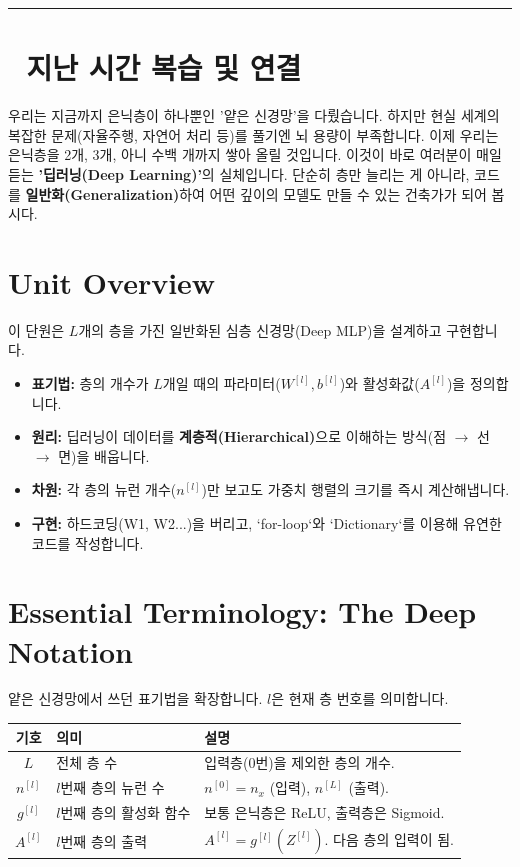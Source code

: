 \documentclass[11pt,a4paper]{book}
\theoremstyle{definition}
\begin{document}
\vspace{0.5cm}
\hrule
\vspace{0.5cm}

\section*{🔗 지난 시간 복습 및 연결}
우리는 지금까지 은닉층이 하나뿐인 '얕은 신경망'을 다뤘습니다. 하지만 현실 세계의 복잡한 문제(자율주행, 자연어 처리 등)를 풀기엔 뇌 용량이 부족합니다.
이제 우리는 은닉층을 2개, 3개, 아니 수백 개까지 쌓아 올릴 것입니다. 이것이 바로 여러분이 매일 듣는 \textbf{'딥러닝(Deep Learning)'}의 실체입니다. 단순히 층만 늘리는 게 아니라, 코드를 \textbf{일반화(Generalization)}하여 어떤 깊이의 모델도 만들 수 있는 건축가가 되어 봅시다.

\section{Unit Overview}
\begin{summarybox}[title={핵심 목표}]
이 단원은 $L$개의 층을 가진 일반화된 심층 신경망(Deep MLP)을 설계하고 구현합니다.
\begin{itemize}
    \item \textbf{표기법:} 층의 개수가 $L$개일 때의 파라미터($W^{[l]}, b^{[l]}$)와 활성화값($A^{[l]}$)을 정의합니다.
    \item \textbf{원리:} 딥러닝이 데이터를 \textbf{계층적(Hierarchical)}으로 이해하는 방식(점 $\to$ 선 $\to$ 면)을 배웁니다.
    \item \textbf{차원:} 각 층의 뉴런 개수($n^{[l]}$)만 보고도 가중치 행렬의 크기를 즉시 계산해냅니다.
    \item \textbf{구현:} 하드코딩(W1, W2...)을 버리고, `for-loop`와 `Dictionary`를 이용해 유연한 코드를 작성합니다.
\end{itemize}
\end{summarybox}

\section{Essential Terminology: The Deep Notation}
얕은 신경망에서 쓰던 표기법을 확장합니다. $l$은 현재 층 번호를 의미합니다.

\begin{center}
\begin{tabular}{|c|l|l|}
\hline
\textbf{기호} & \textbf{의미} & \textbf{설명} \\ \hline
$L$ & 전체 층 수 & 입력층(0번)을 제외한 층의 개수. \\ \hline
$n^{[l]}$ & $l$번째 층의 뉴런 수 & $n^{[0]}=n_x$ (입력), $n^{[L]}$ (출력). \\ \hline
$g^{[l]}$ & $l$번째 층의 활성화 함수 & 보통 은닉층은 ReLU, 출력층은 Sigmoid. \\ \hline
$A^{[l]}$ & $l$번째 층의 출력 & $A^{[l]} = g^{[l]}(Z^{[l]})$. 다음 층의 입력이 됨. \\ \hline
\end{tabular}
\end{center}
\end{document}
